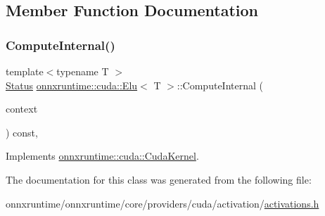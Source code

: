 \subsection{Member Function Documentation}
\mbox{\label{classonnxruntime_1_1cuda_1_1Elu_aa40f277b34ac1ff53dffe20aabc695b3}} 
\subsubsection{\texorpdfstring{Compute\+Internal()}{ComputeInternal()}}
{\footnotesize\ttfamily template$<$typename T $>$ \\
\mbox{\hyperlink{classonnxruntime_1_1common_1_1Status}{Status}} \mbox{\hyperlink{classonnxruntime_1_1cuda_1_1Elu}{onnxruntime\+::cuda\+::\+Elu}}$<$ T $>$\+::Compute\+Internal (\begin{DoxyParamCaption}\item[{\mbox{\hyperlink{classonnxruntime_1_1OpKernelContext}{Op\+Kernel\+Context}} $\ast$}]{context }\end{DoxyParamCaption}) const\hspace{0.3cm}{\ttfamily [override]}, {\ttfamily [virtual]}}



Implements \mbox{\hyperlink{classonnxruntime_1_1cuda_1_1CudaKernel_aca7af04ae448017d6023d30bba231ebb}{onnxruntime\+::cuda\+::\+Cuda\+Kernel}}.



The documentation for this class was generated from the following file\+:\begin{DoxyCompactItemize}
\item 
onnxruntime/onnxruntime/core/providers/cuda/activation/\mbox{\hyperlink{cuda_2activation_2activations_8h}{activations.\+h}}\end{DoxyCompactItemize}
